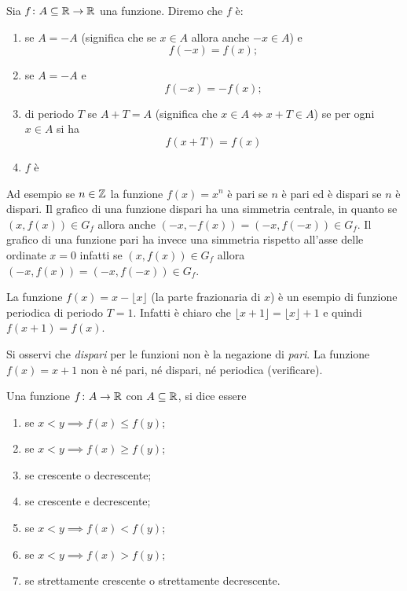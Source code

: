 \begin{definition}[simmetrie]
Sia $f\colon A \subseteq \mathbb R \to \mathbb R$ una funzione.
Diremo che $f$ è:
\begin{enumerate}
\item {}
%
se $A=-A$ (significa che se $x\in A$ allora anche $-x\in A$) e
\[
  f(-x) = f(x);
\]
\item {}
%
se $A=-A$ e
\[
  f(-x) = -f(x);
\]
\item {}
%
di periodo $T$ se $A+T=A$
(significa che $x\in A \iff x+T \in A$)
se per ogni $x\in A$ si ha
\[
  f(x+T)=f(x)
\]
\item $f$ è 
\end{enumerate}
\end{definition}

Ad esempio se $n\in \mathbb Z$ la funzione $f(x)=x^n$
è pari se $n$ è pari ed è dispari se $n$ è dispari.
Il grafico di una funzione dispari ha una simmetria
centrale, in quanto se $(x,f(x))\in G_f$ allora
anche $(-x,-f(x)) = (-x,f(-x))\in G_f$.
Il grafico di una funzione pari ha invece una
simmetria rispetto all'asse delle ordinate $x=0$
infatti se $(x,f(x))\in G_f$ allora $(-x,f(x)) = (-x,f(-x)) \in G_f$.

La funzione $f(x) = x - \lfloor x\rfloor$ (la parte frazionaria di $x$)
è un esempio di funzione periodica di periodo $T=1$. Infatti
è chiaro che $\lfloor x+1\rfloor = \lfloor x \rfloor +1$ e quindi
$f(x+1)=f(x)$.

Si osservi che \emph{dispari} per le funzioni non è la negazione
di \emph{pari}.
La funzione $f(x) = x+1$ non è né pari, né dispari, né periodica
(verificare).

\begin{definition}
\label{def:monotonia}%
\mymark{***}%
%
%
%
Una funzione $f\colon A \to \mathbb R$ con $A\subseteq \mathbb R$, si
dice essere
\begin{enumerate}
\item {} se $x < y \implies f(x) \le f(y)$;
\item {} se $x < y \implies f(x) \ge f(y)$;
\item {} se crescente o decrescente;
\item {} se crescente e decrescente;
\item {} se $x<y \implies f(x) < f(y)$;
\item {} se $x<y \implies f(x) > f(y)$;
\item {} se strettamente crescente o strettamente decrescente.
\end{enumerate}
\end{definition}

